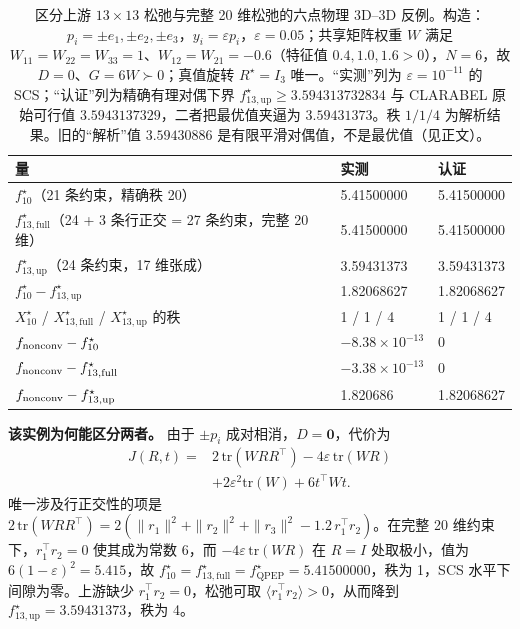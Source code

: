 \begin{table}[t]
\centering
\caption{区分上游 $13\times13$ 松弛与完整 20 维松弛的六点物理 3D--3D 反例。构造：$p_i=\pm e_1,\pm e_2,\pm e_3$，$y_i=\varepsilon p_i$，$\varepsilon=0.05$；共享矩阵权重 $W$ 满足 $W_{11}=W_{22}=W_{33}=1$、$W_{12}=W_{21}=-0.6$（特征值 $0.4,1.0,1.6>0$），$N=6$，故 $D=0$、$G=6W\succ0$；真值旋转 $R^\star=I_3$ 唯一。“实测”列为 $\varepsilon=10^{-11}$ 的 SCS；“认证”列为精确有理对偶下界 $f^\star_{13,\mathrm{up}}\ge3.594313732834$ 与 CLARABEL 原始可行值 $3.5943137329$，二者把最优值夹逼为 $3.59431373$。秩 $1/1/4$ 为解析结果。旧的“解析”值 $3.59430886$ 是有限平滑对偶值，不是最优值（见正文）。}
\label{tab:6point}
\scriptsize
\setlength{\tabcolsep}{3pt}
\begin{tabular}{@{}p{4.1cm} l l@{}}
\toprule
量 & 实测 & 认证\\
\midrule
$f^\star_{10}$（21 条约束，精确秩 20） & 5.41500000 & 5.41500000\\
$f^\star_{13,\mathrm{full}}$（24 + 3 条行正交 = 27 条约束，完整 20 维） & 5.41500000 & 5.41500000\\
$f^\star_{13,\mathrm{up}}$（24 条约束，17 维张成） & 3.59431373 & 3.59431373\\
$f^\star_{10}-f^\star_{13,\mathrm{up}}$ & 1.82068627 & 1.82068627\\
$X^\star_{10}$ / $X^\star_{13,\mathrm{full}}$ / $X^\star_{13,\mathrm{up}}$ 的秩 & 1 / 1 / 4 & 1 / 1 / 4\\
$f_{\rm nonconv}-f^\star_{10}$ & $-8.38\times10^{-13}$ & 0\\
$f_{\rm nonconv}-f^\star_{13,\mathrm{full}}$ & $-3.38\times10^{-13}$ & 0\\
$f_{\rm nonconv}-f^\star_{13,\mathrm{up}}$ & 1.820686 & 1.82068627\\
\bottomrule
\end{tabular}
\end{table}

\textbf{该实例为何能区分两者。} 由于 $\pm p_i$ 成对相消，$D=\mathbf{0}$，代价为
\begin{equation}
\begin{split}
J(R,t)={}&2\,\mathrm{tr}(WRR^\top)-4\varepsilon\,\mathrm{tr}(WR)\\
&+2\varepsilon^2\mathrm{tr}(W)+6t^\top Wt .
\end{split}
\label{eq:sixpoint}
\end{equation}
唯一涉及行正交性的项是 $2\,\mathrm{tr}(WRR^\top)=2(\|r_1\|^2+\|r_2\|^2+\|r_3\|^2-1.2\,r_1^\top r_2)$。在完整 20 维约束下，$r_1^\top r_2=0$ 使其成为常数 $6$，而 $-4\varepsilon\,\mathrm{tr}(WR)$ 在 $R=I$ 处取极小，值为 $6(1-\varepsilon)^2=5.415$，故 $f^\star_{10}=f^\star_{13,\mathrm{full}}=f^\star_{\mathrm{QPEP}}=5.41500000$，秩为 1，SCS 水平下间隙为零。上游缺少 $r_1^\top r_2=0$，松弛可取 $\langle r_1^\top r_2\rangle>0$，从而降到 $f^\star_{13,\mathrm{up}}=3.59431373$，秩为 4。

